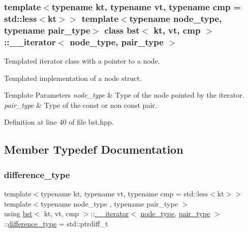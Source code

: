 \subsubsection*{template$<$typename kt, typename vt, typename cmp = std\+::less$<$kt$>$$>$\newline
template$<$typename node\+\_\+type, typename pair\+\_\+type$>$\newline
class bst$<$ kt, vt, cmp $>$\+::\+\_\+\+\_\+iterator$<$ node\+\_\+type, pair\+\_\+type $>$}

Templated iterator class with a pointer to a node. 

Templated implementation of a node struct.


\begin{DoxyTemplParams}{Template Parameters}
{\em node\+\_\+type} & Type of the node pointed by the iterator. \\
\hline
{\em pair\+\_\+type} & Type of the const or non const pair. \\
\hline
\end{DoxyTemplParams}


Definition at line 40 of file bst.\+hpp.



\subsection{Member Typedef Documentation}
\mbox{\label{classbst_1_1____iterator_a4a4371f84bac8f8717fe4fdf57a9119d}} 
\subsubsection{\texorpdfstring{difference\+\_\+type}{difference\_type}}
{\footnotesize\ttfamily template$<$typename kt, typename vt, typename cmp = std\+::less$<$kt$>$$>$ \\
template$<$typename node\+\_\+type , typename pair\+\_\+type $>$ \\
using \hyperlink{classbst}{bst}$<$ kt, vt, cmp $>$\+::\hyperlink{classbst_1_1____iterator}{\+\_\+\+\_\+iterator}$<$ \hyperlink{classbst_a062eb2a1ac54802dbc4f0f74ae2afd01}{node\+\_\+type}, \hyperlink{classbst_a7b11cca2a3b4394915600194f741ab16}{pair\+\_\+type} $>$\+::\hyperlink{classbst_1_1____iterator_a4a4371f84bac8f8717fe4fdf57a9119d}{difference\+\_\+type} =  std\+::ptrdiff\+\_\+t}

